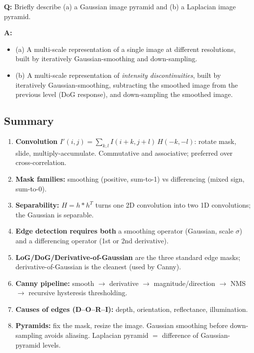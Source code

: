 \begin{exbox}
\textbf{Q:} Briefly describe (a) a Gaussian image pyramid and (b) a Laplacian image pyramid.

\textbf{A:}
\begin{itemize}
  \item (a) A multi-scale representation of a single image at different resolutions, built by iteratively Gaussian-smoothing and down-sampling.
  \item (b) A multi-scale representation of \emph{intensity discontinuities}, built by iteratively Gaussian-smoothing, subtracting the smoothed image from the previous level (DoG response), and down-sampling the smoothed image.
\end{itemize}
\end{exbox}

\bigseparator

\subsection{Summary}

\begin{keybox}
\begin{enumerate}
  \item \textbf{Convolution} $I'(i,j) = \sum_{k,l} I(i+k, j+l)\, H(-k,-l)$: rotate mask, slide, multiply-accumulate. Commutative and associative; preferred over cross-correlation.
  \item \textbf{Mask families:} smoothing (positive, sum-to-1) vs differencing (mixed sign, sum-to-0).
  \item \textbf{Separability:} $H = h \ast h^T$ turns one 2D convolution into two 1D convolutions; the Gaussian is separable.
  \item \textbf{Edge detection requires both} a smoothing operator (Gaussian, scale $\sigma$) and a differencing operator (1st or 2nd derivative).
  \item \textbf{LoG/DoG/Derivative-of-Gaussian} are the three standard edge masks; derivative-of-Gaussian is the cleanest (used by Canny).
  \item \textbf{Canny pipeline:} smooth $\to$ derivative $\to$ magnitude/direction $\to$ NMS $\to$ recursive hysteresis thresholding.
  \item \textbf{Causes of edges (D--O--R--I):} depth, orientation, reflectance, illumination.
  \item \textbf{Pyramids:} fix the mask, resize the image. Gaussian smoothing before down-sampling avoids aliasing. Laplacian pyramid $=$ difference of Gaussian-pyramid levels.
\end{enumerate}
\end{keybox}

